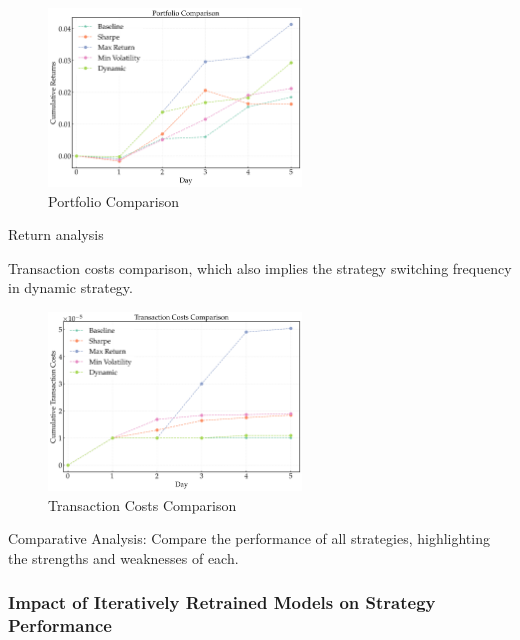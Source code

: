 \begin{figure}[htbp]
    \centering
    \includegraphics[width=0.6\textwidth]{figures/portfolio_comparison_final_non.png}
    \caption{Portfolio Comparison}
    \label{fig:portfolio_comparison_non_iterative}
\end{figure}

Return analysis

Transaction costs comparison, which also implies the strategy switching frequency in dynamic strategy.

\begin{figure}[htbp]
    \centering
    \includegraphics[width=0.6\textwidth]{figures/trx_costs_comparison_final_non.png}
    \caption{Transaction Costs Comparison}
    \label{fig:trx_costs_comparison_non_iterative}
\end{figure}




Comparative Analysis:
Compare the performance of all strategies, highlighting the strengths and weaknesses of each.

\subsubsection{Impact of Iteratively Retrained Models on Strategy Performance}

